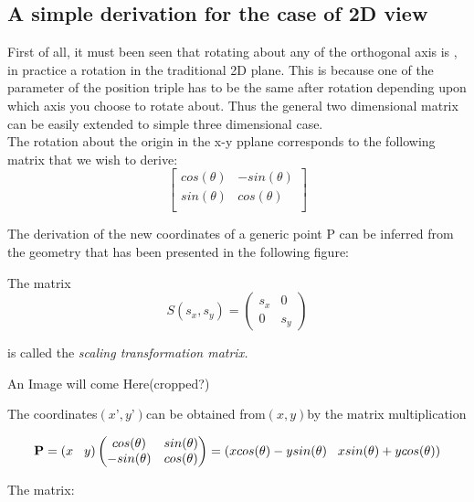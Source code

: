 \documentclass[12pt]{report}
\begin{document}
\subsection{A simple derivation for the case of 2D view}

First of all, it must been seen that rotating about any of the orthogonal axis is , in practice a rotation in the traditional 2D plane. This is because one of the parameter of the position triple has to be the same after rotation depending upon which axis you choose to rotate about. Thus the general two dimensional matrix can be easily extended to simple three dimensional case.
\vspace{0.3cm}
\\The rotation about the origin in the x-y pplane corresponds to the following matrix that we wish to derive:
\[ \begin{bmatrix}
cos(\theta)  &  -sin(\theta) \\
sin(\theta)  &  cos(\theta) \\
\end{bmatrix}\]

\hspace{1cm} The derivation of the new coordinates of a generic point P can be inferred from the geometry that has been presented in the following figure:
\\
\vspace{0.2cm}

The matrix
\[ S(s_{x},s_{y}) = \begin{pmatrix}
s_{x} & 0 \\
0 & s_{y}
\end{pmatrix}  \]
\begin{center}
  is called the \textit{scaling transformation matrix.}

  An Image will come Here(cropped?)
  \vspace{4cm}
\end{center}

The coordinates$ (x’ , y’ ) $can be obtained from$ (x, y) $by the matrix multiplication

\[ \textbf{P} = (x \hspace{0.3cm} y) \begin{pmatrix}
cos(\theta) & sin(\theta) \\
-sin(\theta) & cos(\theta)
\end{pmatrix} = (x cos(\theta) - y sin(\theta) \hspace{0.3cm} x sin(\theta) + y cos(\theta) ) \]

The matrix:
\end{document}
